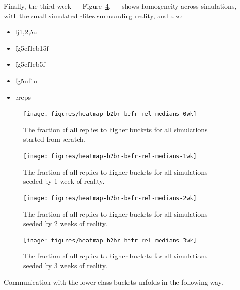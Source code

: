\documentclass[10pt,oneside]{memoir}
\begin{document}
Finally, the third week --- Figure~\ref{figure:heatmap-b2br-befr-rel-medians-3wk}, ---  shows homogeneity across simulations, with the small simulated elites surrounding reality, and also


\begin{itemize}


\item lj{1,2,5}u

\item fg5cf1cb15f

\item fg5cf1cb5f

\item fg5uf1u

\item ereps
\end{itemize}


\begin{figure}
\begin{center}
    \texttt{[image: figures/heatmap-b2br-befr-rel-medians-0wk]}
    \caption{The fraction of all replies to higher buckets for all simulations started from scratch.}
    \label{figure:heatmap-b2br-befr-rel-medians-0wk}
\end{center}
\end{figure}

\begin{figure}
\begin{center}
    \texttt{[image: figures/heatmap-b2br-befr-rel-medians-1wk]}
    \caption{The fraction of all replies to higher buckets for all simulations seeded by 1 week of reality.}
    \label{figure:heatmap-b2br-befr-rel-medians-1wk}
\end{center}
\end{figure}

\begin{figure}
\begin{center}
    \texttt{[image: figures/heatmap-b2br-befr-rel-medians-2wk]}
    \caption{The fraction of all replies to higher buckets for all simulations seeded by 2 weeks of reality.}
    \label{figure:heatmap-b2br-befr-rel-medians-2wk}
\end{center}
\end{figure}

\begin{figure}
\begin{center}
    \texttt{[image: figures/heatmap-b2br-befr-rel-medians-3wk]}
    \caption{The fraction of all replies to higher buckets for all simulations seeded by 3 weeks of reality.}
    \label{figure:heatmap-b2br-befr-rel-medians-3wk}
\end{center}
\end{figure}
Communication with the lower-class buckets unfolds in the following way.
\end{document}
